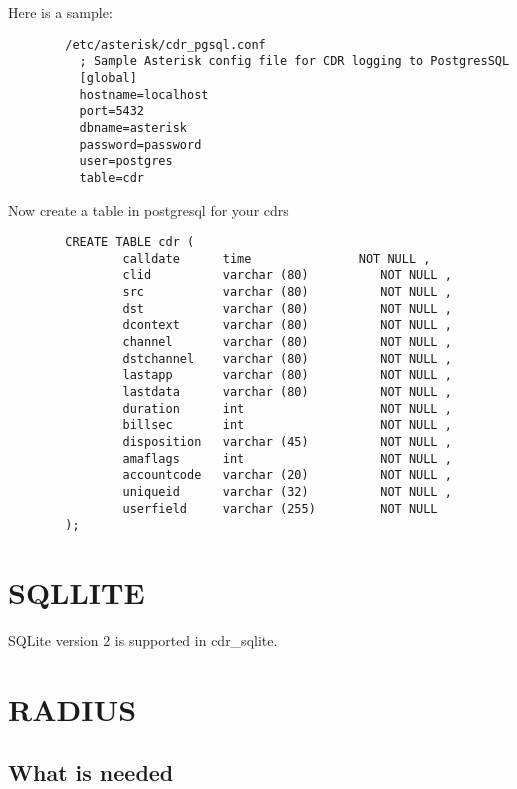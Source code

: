         Here is a sample:
\begin{astlisting}
\begin{verbatim}
        /etc/asterisk/cdr_pgsql.conf
          ; Sample Asterisk config file for CDR logging to PostgresSQL
          [global]
          hostname=localhost
          port=5432
          dbname=asterisk
          password=password
          user=postgres
          table=cdr
\end{verbatim}
\end{astlisting}
        Now create a table in postgresql for your cdrs
\begin{astlisting}
\begin{verbatim}
        CREATE TABLE cdr (
                calldate      time               NOT NULL ,
                clid          varchar (80)          NOT NULL ,
                src           varchar (80)          NOT NULL ,
                dst           varchar (80)          NOT NULL ,
                dcontext      varchar (80)          NOT NULL ,
                channel       varchar (80)          NOT NULL ,
                dstchannel    varchar (80)          NOT NULL ,
                lastapp       varchar (80)          NOT NULL ,
                lastdata      varchar (80)          NOT NULL ,
                duration      int                   NOT NULL ,
                billsec       int                   NOT NULL ,
                disposition   varchar (45)          NOT NULL ,
                amaflags      int                   NOT NULL ,
                accountcode   varchar (20)          NOT NULL ,
                uniqueid      varchar (32)          NOT NULL ,
                userfield     varchar (255)         NOT NULL
        );
\end{verbatim}
\end{astlisting}

\section{SQLLITE}

SQLite version 2 is supported in cdr\_sqlite.

\section{RADIUS}

\subsection{What is needed}

